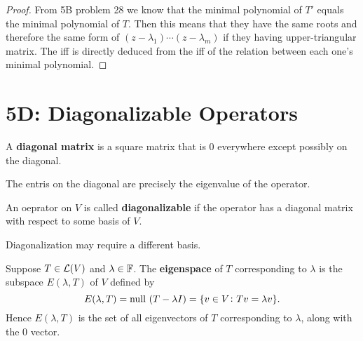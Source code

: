 \documentclass{extarticle}
\begin{document}
\begin{proof}
From 5B problem 28 we know that the minimal polynomial of \(T'\) equals the minimal polynomial of \(T\). 
Then this means that they have the same roots and therefore the same form of \((z - \lambda_1) 
\cdots (z - \lambda_m)\) if they having upper-triangular matrix. The iff is directly deduced from the iff 
of the relation between each one's minimal polynomial.
\end{proof}










\newpage 
\section*{5D: Diagonalizable Operators}


\begin{definition}
    A \textbf{diagonal matrix} is a square matrix that is 0 everywhere except possibly on the 
    diagonal.    
\end{definition}


\begin{remark}
    The entris on the diagonal are precisely the eigenvalue of the operator.
\end{remark}

\begin{definition}[diagonalizable]
    An oeprator on \(V\) is called \textbf{diagonalizable} if the operator has a diagonal matrix 
    with respect to some basis of \(V\).
\end{definition}


\begin{remark}
    Diagonalization may require a different basis.
\end{remark}

\begin{definition}
    Suppose \(T \in \mathcal{L}(V)\) and \(\lambda \in \mathbb{F}\). The \textbf{eigenspace} of \(T\) corresponding to 
    \(\lambda\) is the subspace \(E (\lambda, T)\) of \(V\) defined by 
    \[E(\lambda, T) = \text{null } (T - \lambda I) = \{v \in V \colon Tv = \lambda v\}.\]
    Hence \(E(\lambda, T)\) is the set of all eigenvectors of \(T\) corresponding to \(\lambda\), along 
    with the 0 vector. 
\end{definition}
\end{document}
